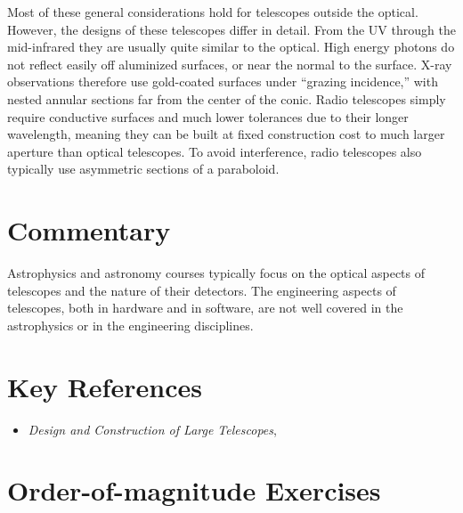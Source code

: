 Most of these general considerations hold for telescopes outside the
optical. However, the designs of these telescopes differ in
detail. From the UV through the mid-infrared they are usually quite
similar to the optical. High energy photons do not reflect easily off
aluminized surfaces, or near the normal to the surface. X-ray
observations therefore use gold-coated surfaces under ``grazing
incidence,'' with nested annular sections far from the center of the
conic. Radio telescopes simply require conductive surfaces and much
lower tolerances due to their longer wavelength, meaning they can be
built at fixed construction cost to much larger aperture than optical
telescopes. To avoid interference, radio telescopes also typically use
asymmetric sections of a paraboloid.

\section{Commentary}

Astrophysics and astronomy courses typically focus on the optical
aspects of telescopes and the nature of their detectors.  The
engineering aspects of telescopes, both in hardware and in software,
are not well covered in the astrophysics or in the engineering
disciplines. 

\section{Key References}

\begin{itemize}
  \item
    {\it Design and Construction of Large Telescopes},
      \citet{bely03a}
\end{itemize}

\section{Order-of-magnitude Exercises}

